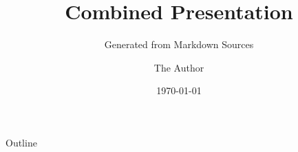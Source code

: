 \documentclass{beamer}
\title{Combined Presentation}
\subtitle{Generated from Markdown Sources}
\author{The Author}
\institute{The Organization}
\date{\today}
\begin{document}
\frame{\titlepage}

\begin{frame}{Outline}
  \tableofcontents
\end{frame}




\end{document}
